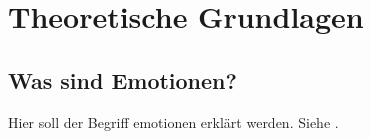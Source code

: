\section{Theoretische Grundlagen}
\subsection{Was sind Emotionen?}
Hier soll der Begriff emotionen erklärt werden. Siehe \cite{Sch13}.